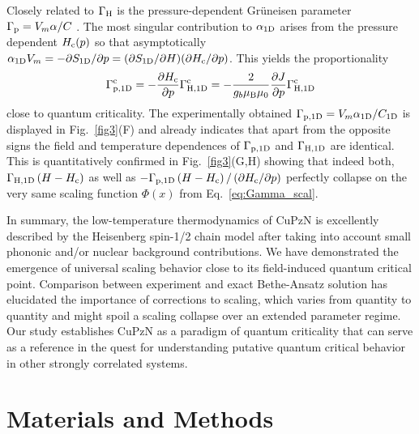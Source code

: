 \documentclass[12pt]{article}
\begin{document}
Closely related to $\Gamma_{\rm H}$ is the pressure-dependent Gr\"uneisen parameter $\Gamma_{\rm p} = V_m \alpha/C$ \cite{Zhu2003,Garst2005}. The most singular contribution to $\alpha_{\rm 1D}$ arises from the pressure dependent $H_{\rm c}(p)$ so that asymptotically $\alpha_{\rm 1D} V_m= - \partial S_{\rm 1D}/\partial p = (\partial S_{\rm 1D}/\partial H) (\partial H_{\rm c}/\partial p)$. This yields the proportionality
\begin{align}
\Gamma^{\rm c}_{\rm p,1D} = - \frac{\partial H_{\rm c}}{\partial p} \Gamma^{\rm c}_{\rm H, 1D} 
= - \frac{2}{g_b \mu_{\rm B} \mu_0} \frac{\partial J}{\partial p} \Gamma^{\rm c}_{\rm H, 1D} 
\label{eq:Gamma_H_p}
\end{align}
close to quantum criticality. The experimentally obtained $\Gamma_{\rm p,1D} = V_m \alpha_{\rm 1D}/C_{\rm 1D}$ is displayed in Fig.~\ref{fig3}(F) and already indicates that apart from the opposite signs the field and temperature dependences of $\Gamma_{\rm p,1D}$ and $\Gamma_{\rm H,1D}$ are identical. This is quantitatively confirmed in Fig.~\ref{fig3}(G,H) showing that indeed both, $\Gamma_{\rm H,1D}\,(H-H_{\rm c})$ as well as $-\Gamma_{\rm p,1D}\,(H-H_{\rm c})\,/\,(\partial H_{\rm c}/\partial p)$ perfectly collapse on the very same scaling function $\Phi(x)$ from Eq.~\eqref{eq:Gamma_scal}.

In summary, the low-temperature thermodynamics of CuPzN is excellently described by the Heisenberg spin-1/2 chain model after taking into account small phononic and/or nuclear background contributions. We have demonstrated the emergence of universal scaling behavior close to its field-induced quantum critical point. Comparison between experiment and exact Bethe-Ansatz solution has elucidated the importance of corrections to scaling, which varies from quantity to quantity and might spoil a scaling collapse over an extended parameter regime. 
%
Our study establishes CuPzN as a paradigm of quantum criticality that can serve as a reference in the quest for understanding putative quantum critical behavior in other strongly correlated systems.




\section*{Materials and Methods}
\end{document}
